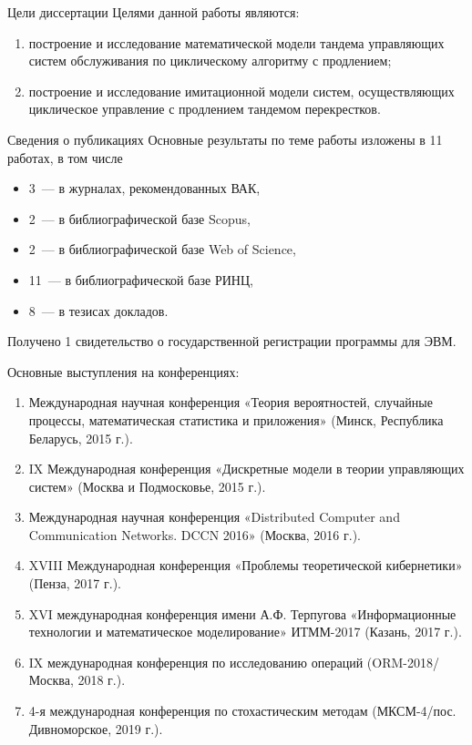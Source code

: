 \documentclass[10pt]{beamer}
\begin{document}
\begin{frame}{Цели диссертации}
Целями данной работы являются:
\begin{enumerate}
    \item построение
и исследование математической модели тандема управляющих систем обслуживания по циклическому алгоритму с продлением;
    \item построение и исследование
 имитационной модели систем, осуществляющих циклическое управление с продлением тандемом перекрестков.
\end{enumerate}
\end{frame}

\begin{frame}{Сведения о публикациях}
Основные результаты по теме работы изложены в 11 работах, в том числе
    \begin{itemize}
        \item 3~--- в журналах, рекомендованных ВАК,
        \item 2~--- в библиографической базе Scopus, 
        \item 2~--- в библиографической базе Web of Science, 
        \item 11~--- в библиографической базе РИНЦ,
        \item 8~--- в тезисах докладов.
    \end{itemize}
    Получено 1 свидетельство о государственной регистрации программы для ЭВМ.
\end{frame}
\begin{frame}{Основные выступления на конференциях:}
  \begin{enumerate}
 \item Международная
научная конференция «Теория вероятностей, случайные процессы, математическая статистика и приложения» (Минск, Республика Беларусь, 2015 г.).
\item IX Международная конференция «Дискретные модели в теории управляющих систем» (Москва и Подмосковье, 2015 г.).
\item Международная
научная конференция «Distributed Computer and Communication
Networks. DCCN 2016» (Москва, 2016 г.).
\item XVIII Международная конференция «Проблемы теоретической кибернетики» (Пенза, 2017 г.).
\item XVI международная конференция имени А.Ф. Терпугова «Информационные
технологии и математическое моделирование» ИТММ-2017 (Казань, 2017 г.).
\item IX международная конференция по исследованию операций  (ORM-2018/ Москва, 2018 г.).
\item 4-я международная конференция по стохастическим методам (МКСМ-4/пос. Дивноморское, 2019 г.).
\end{enumerate} 
  \end{frame}
  
\end{document}
